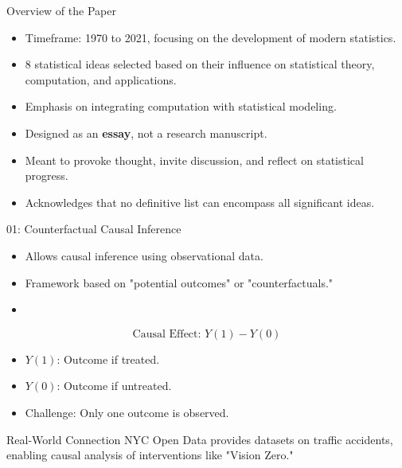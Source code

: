 \documentclass{beamer}
\begin{document}
\begin{frame}{Overview of the Paper}
\begin{itemize}
    \item Timeframe: 1970 to 2021, focusing on the development of modern statistics.
    \item 8 statistical ideas selected based on their influence on statistical theory, computation, and applications.
    \item Emphasis on integrating computation with statistical modeling.
    \item Designed as an \textbf{essay}, not a research manuscript.
            \item Meant to provoke thought, invite discussion, and reflect on statistical progress.
            \item Acknowledges that no definitive list can encompass all significant ideas.
\end{itemize}
\end{frame}

\begin{frame}{01: Counterfactual Causal Inference}
\begin{itemize}
    \item Allows causal inference using observational data.
    \item Framework based on "potential outcomes" or "counterfactuals."
    \item 
\end{itemize}

\[
\text{Causal Effect: } Y(1) - Y(0)
\]
\begin{itemize}
    \item \( Y(1) \): Outcome if treated.
    \item \( Y(0) \): Outcome if untreated.
    \item Challenge: Only one outcome is observed.
\end{itemize}

\begin{block}{Real-World Connection}
NYC Open Data provides datasets on traffic accidents, enabling causal analysis of interventions like "Vision Zero."
\end{block}
\end{frame}
\end{document}
